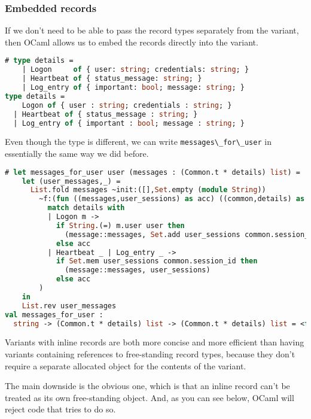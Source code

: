 \hypertarget{embedded-records}{%
\subsubsection{Embedded records}\label{embedded-records}}

If we don't need to be able to pass the record types separately from the
variant, then OCaml allows us to embed the records directly into the
variant.

\begin{lstlisting}[language=Caml]
# type details =
    | Logon     of { user: string; credentials: string; }
    | Heartbeat of { status_message: string; }
    | Log_entry of { important: bool; message: string; }
type details =
    Logon of { user : string; credentials : string; }
  | Heartbeat of { status_message : string; }
  | Log_entry of { important : bool; message : string; }
\end{lstlisting}

Even though the type is different, we can write
\passthrough{\lstinline!messages\_for\_user!} in essentially the same
way we did before.

\begin{lstlisting}[language=Caml]
# let messages_for_user user (messages : (Common.t * details) list) =
    let (user_messages,_) =
      List.fold messages ~init:([],Set.empty (module String))
        ~f:(fun ((messages,user_sessions) as acc) ((common,details) as message) ->
          match details with
          | Logon m ->
            if String.(=) m.user user then
              (message::messages, Set.add user_sessions common.session_id)
            else acc
          | Heartbeat _ | Log_entry _ ->
            if Set.mem user_sessions common.session_id then
              (message::messages, user_sessions)
            else acc
        )
    in
    List.rev user_messages
val messages_for_user :
  string -> (Common.t * details) list -> (Common.t * details) list = <fun>
\end{lstlisting}

Variants with inline records are both more concise and more efficient
than having variants containing references to free-standing record
types, because they don't require a separate allocated object for the
contents of the variant.

The main downside is the obvious one, which is that an inline record
can't be treated as its own free-standing object. And, as you can see
below, OCaml will reject code that tries to do so.

